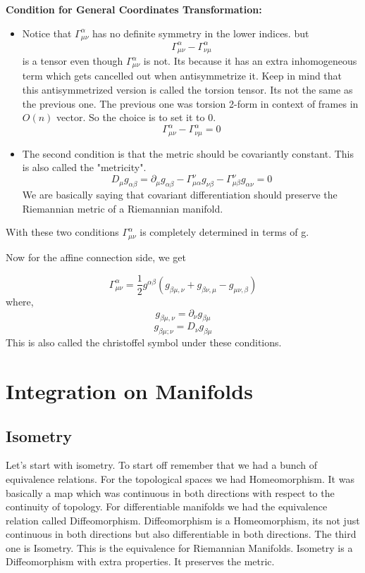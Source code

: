 \documentclass{article}
\begin{document}
\textbf{Condition for General Coordinates Transformation: }
\begin{itemize}
    \item Notice that \(\Gamma^\alpha _{\mu \nu}\) has no definite symmetry in the lower indices. but \[ \Gamma^\alpha _{\mu \nu} - \Gamma^\alpha_{\nu \mu} \] is a tensor even though \( \Gamma^\alpha_{\mu \nu } \) is not. Its because it has an extra inhomogeneous term which gets cancelled out when antisymmetrize it. 
    Keep in mind that this antisymmetrized version is called the torsion tensor. Its not the same as the previous one. The previous one was torsion 2-form in context of frames in \(O(n)\) vector. So the choice is to set it to 0. 
     \[ \Gamma^\alpha _{\mu \nu} - \Gamma^\alpha_{\nu \mu} = 0 \] 
    
    \item The second condition is that the metric should be covariantly constant. This is also called the "metricity". 
        \[ D_\mu g_{\alpha\beta} = \partial_\mu g_{\alpha\beta} - \Gamma^\nu_{\mu \alpha} g_{\nu \beta} - \Gamma^\nu_{\mu \beta}g_{\alpha\nu} = 0 \]
We are basically saying that covariant differentiation should preserve the Riemannian metric of a Riemannian manifold.
\end{itemize}
With these two conditions \( \Gamma^\alpha_{\mu \nu}\) is completely determined in terms of g. 

Now for the affine connection side, we get 

\[ \Gamma^\alpha_{\mu \nu} = \frac{1}{2} g^{\alpha \beta} (g_{\beta \mu, \nu} + g_{\beta \nu, \mu } - g_{\mu \nu, \beta} ) \]
where, 
\[    g_{\beta \mu, \nu} =  \partial_\nu g_{\beta \mu}  \]
\[    g_{\beta \mu; \nu} =  D_\nu g_{\beta \mu}  \]
This is also called the christoffel symbol under these conditions. 

\section{Integration on Manifolds}

\subsection{Isometry}
Let's start with isometry. To start off remember that we had a bunch of equivalence relations. For the topological spaces we had Homeomorphism. It was basically a map which was continuous in both directions with respect to the continuity of topology. For differentiable manifolds we had the equivalence relation called Diffeomorphism. Diffeomorphism is a Homeomorphism, its not just continuous in both directions but also differentiable in both directions. The third one is Isometry. This is the equivalence for Riemannian Manifolds. Isometry is a Diffeomorphism with extra properties. It preserves the metric. 
\end{document}
